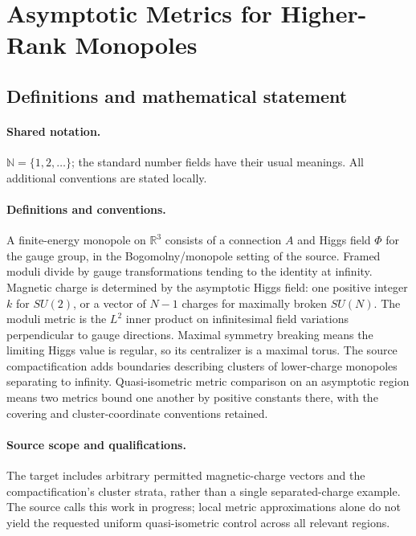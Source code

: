 \documentclass[11pt]{article}
\begin{document}
\section{Asymptotic Metrics for Higher-Rank Monopoles}\label{statement}

\subsection{Definitions and mathematical statement}

\paragraph{Shared notation.}$\mathbb N=\{1,2,\ldots\}$; the standard number fields have their usual meanings. All additional conventions are stated locally.


\paragraph{Definitions and conventions.} A finite-energy monopole on $\mathbb R^3$ consists of a connection $A$ and Higgs field $\Phi$ for the gauge group, in the Bogomolny/monopole setting of the source. Framed moduli divide by gauge transformations tending to the identity at infinity. Magnetic charge is determined by the asymptotic Higgs field: one positive integer $k$ for $SU(2)$, or a vector of $N-1$ charges for maximally broken $SU(N)$. The moduli metric is the $L^2$ inner product on infinitesimal field variations perpendicular to gauge directions. Maximal symmetry breaking means the limiting Higgs value is regular, so its centralizer is a maximal torus. The source compactification adds boundaries describing clusters of lower-charge monopoles separating to infinity. Quasi-isometric metric comparison on an asymptotic region means two metrics bound one another by positive constants there, with the covering and cluster-coordinate conventions retained.

\paragraph{Source scope and qualifications.} The target includes arbitrary permitted magnetic-charge vectors and the compactification's cluster strata, rather than a single separated-charge example. The source calls this work in progress; local metric approximations alone do not yield the requested uniform quasi-isometric control across all relevant regions.
\end{document}
